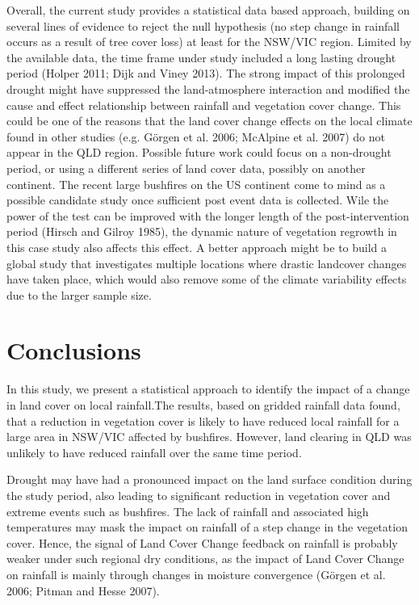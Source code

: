 \documentclass[fleqn,10pt,lineno]{wlpeerj} %
\begin{document}
Overall, the current study provides a statistical data based approach,
building on several lines of evidence to reject the null hypothesis (no
step change in rainfall occurs as a result of tree cover loss) at least
for the NSW/VIC region. Limited by the available data, the time frame
under study included a long lasting drought period (Holper 2011; Dijk
and Viney 2013). The strong impact of this prolonged drought might have
suppressed the land-atmosphere interaction and modified the cause and
effect relationship between rainfall and vegetation cover change. This
could be one of the reasons that the land cover change effects on the
local climate found in other studies (e.g. Görgen et al. 2006; McAlpine
et al. 2007) do not appear in the QLD region. Possible future work could
focus on a non-drought period, or using a different series of land cover
data, possibly on another continent. The recent large bushfires on the
US continent come to mind as a possible candidate study once sufficient
post event data is collected. Wile the power of the test can be improved
with the longer length of the post-intervention period (Hirsch and
Gilroy 1985), the dynamic nature of vegetation regrowth in this case
study also affects this effect. A better approach might be to build a
global study that investigates multiple locations where drastic
landcover changes have taken place, which would also remove some of the
climate variability effects due to the larger sample size.

\section{Conclusions}\label{conclusions}

In this study, we present a statistical approach to identify the impact
of a change in land cover on local rainfall.The results, based on
gridded rainfall data found, that a reduction in vegetation cover is
likely to have reduced local rainfall for a large area in NSW/VIC
affected by bushfires. However, land clearing in QLD was unlikely to
have reduced rainfall over the same time period.

Drought may have had a pronounced impact on the land surface condition
during the study period, also leading to significant reduction in
vegetation cover and extreme events such as bushfires. The lack of
rainfall and associated high temperatures may mask the impact on
rainfall of a step change in the vegetation cover. Hence, the signal of
Land Cover Change feedback on rainfall is probably weaker under such
regional dry conditions, as the impact of Land Cover Change on rainfall
is mainly through changes in moisture convergence (Görgen et al. 2006;
Pitman and Hesse 2007).
\end{document}
